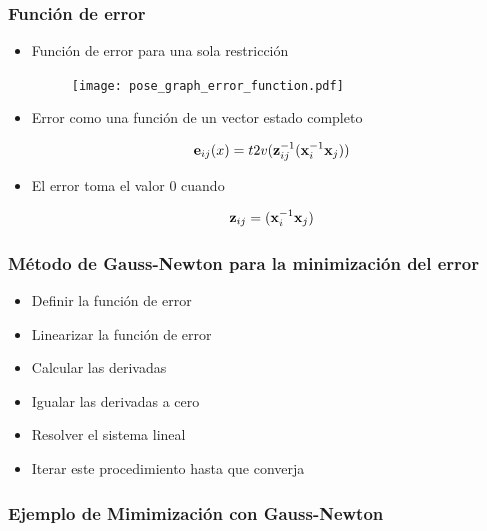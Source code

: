 \begin{frame}
    \frametitle{Función de error}
    
    \begin{itemize}
    \item Función de error para una sola restricción
           \begin{figure}
            \texttt{[image: pose\_graph\_error\_function.pdf]}
        \end{figure}
    
    \item Error como una función de un vector estado completo
    
    \begin{equation*}
        \boldsymbol{\mathbf{e}}_{ij}(x) = t2v({\boldsymbol{\mathbf{z}}}^{-1}_{ij}({\boldsymbol{\mathbf{x}}}^{-1}_{i}\boldsymbol{\mathbf{x}}_{j}))
    \end{equation*}

    \item El error toma el valor 0 cuando
    
    \begin{equation*}
        \boldsymbol{\mathbf{z}}_{ij} = ({\boldsymbol{\mathbf{x}}}^{-1}_{i}\boldsymbol{\mathbf{x}}_{j})
    \end{equation*}
    
    \end{itemize}
\end{frame}

\begin{frame}
    \frametitle{Método de Gauss-Newton para la minimización del error}
    
    \begin{itemize}
        \item Definir la función de error
        \item Linearizar la función de error
        \item Calcular las derivadas
        \item Igualar las derivadas a cero
        \item Resolver el sistema lineal
        \item Iterar este procedimiento hasta que converja
    \end{itemize}

\end{frame}


\begin{frame}
    \frametitle{Ejemplo de Mimimización con Gauss-Newton}
    
   
    
   
\end{frame}


